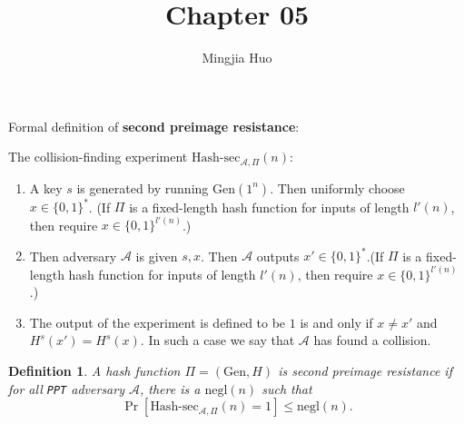 \documentclass[a4paper]{article}
\newtheorem{definition}{Definition}
\newcommand{\negl}{\text{negl}}
\newcommand{\Gen}{\text{Gen}}
\newcommand{\hashsec}{\text{Hash-sec}}
\newcommand{\A}{\mathcal{A}}
\newenvironment{problem}[2][Problem]{\begin{trivlist}
\item[\hskip \labelsep {\bfseries #1}\hskip \labelsep {\bfseries #2.}]}{\end{trivlist}}
\begin{document}
 
 
\title{Chapter 05}
\author{Mingjia Huo}
\date{}
\maketitle

\begin{problem}{5.1}
Formal definition of \textbf{second preimage resistance}:\par
The collision-finding experiment $\hashsec_{\A,\Pi}(n)$:\par\begin{enumerate}
    \item A key $s$ is generated by running $\Gen(1^n)$. Then uniformly choose $x\in\{0,1\}^*$. (If $\Pi$ is a fixed-length hash function for inputs of length $l'(n)$, then require $x\in\{0,1\}^{l'(n)}$.)
    \item Then adversary $\A$ is given $s,x$. Then $\A$ outputs $x'\in\{0,1\}^*$.(If $\Pi$ is a fixed-length hash function for inputs of length $l'(n)$, then require $x\in\{0,1\}^{l'(n)}$.)
    \item The output of the experiment is defined to be $1$ is and only if $x\ne x'$ and $H^s(x')=H^s(x)$. In such a case we say that $\A$ has found a collision.
    \end{enumerate}
    \begin{definition}
    A hash function $\Pi=(\Gen,H)$ is second preimage resistance if for all \texttt{PPT} adversary $\A$, there is a $\negl(n)$ such that \[\Pr[\hashsec_{\A,\Pi}(n)=1]\le\negl(n).\]
    \end{definition}\par\vspace{3ex}
    

\end{problem}
\end{document}
